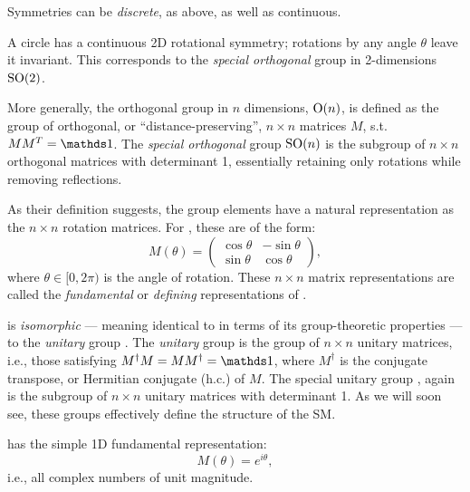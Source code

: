 Symmetries can be \textit{discrete}, as above, as well as continuous.

\begin{example}
\label{example:01_circle}
A circle has a continuous 2D rotational symmetry; rotations by any angle $\theta$ leave it invariant.
This corresponds to the \textit{special orthogonal} group in 2-dimensions $\SO[2]$.
\end{example}

\begin{definition}
\label{def:01_son}
More generally, the orthogonal group in $n$ dimensions, $\OO[n]$, is defined as	the group of orthogonal, or ``distance-preserving'', $n \times n$ matrices $M$, s.t. $MM^T = \identity$.
The \textit{special orthogonal} group $\SO[n]$ is the subgroup of $n \times n$ orthogonal matrices with determinant 1, essentially retaining only rotations while removing reflections.
\end{definition}

As their definition suggests, the \SO[n] group elements have a natural representation as the $n \times n$ rotation matrices.
For \SO[2], these are of the form:
\begin{equation}
	\label{eq:01_so2}
	M(\theta) = \begin{pmatrix}
		\cos \theta & -\sin \theta \\
		\sin \theta & \cos \theta
	\end{pmatrix},
\end{equation}
where $\theta \in [0, 2\pi)$ is the angle of rotation.
These $n \times n$ matrix representations are called the \textit{fundamental} or \textit{defining} representations of \SO[n].

\begin{definition}
\label{def:01_sun}
\SO[2] is \textit{isomorphic} --- meaning identical to in terms of its group-theoretic properties --- to the \textit{unitary} group \UU[1].
The \textit{unitary} group \UU[n] is the group of $n \times n$ unitary matrices, i.e., those satisfying $M^\dagger M = MM^\dagger = \identity$, where $M^\dagger$ is the conjugate transpose, or Hermitian conjugate (h.c.) of $M$.
The special unitary group \SU[n], again is the subgroup of $n \times n$ unitary matrices with determinant 1.
As we will soon see, these groups effectively define the structure of the SM.
\end{definition}

\UU[1] has the simple 1D fundamental representation:
\begin{equation}
	\label{eq:01_u1}
	M(\theta) = e^{i\theta},
\end{equation}
i.e., all complex numbers of unit magnitude.


